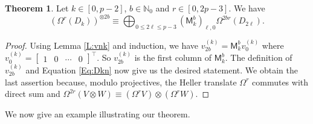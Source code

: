 \documentclass[12pt,reqno]{amsart}
\newcommand{\NN}{\mathbb{N}}
\renewcommand{\leq}{\leqslant}
\newcommand{\M}{\mathsf{M}}
\theoremstyle{definition}
\newtheorem{thm}{Theorem}[section]
\numberwithin{equation}{section}
\begin{document}
\begin{thm}\label{T:PowersofMk}
     Let $k\in [0,p-2]$, $b\in\NN_0$ and $r\in [0,2p-3]$. We have \[(\Omega^r(D_k))^{\otimes 2b} \equiv \bigoplus_{0\leq 2\ell\leq p-3} (\M_k^b)_{\ell,0}\Omega^{2br}(D_{2\ell}).\] 
\end{thm}
\begin{proof}
    Using Lemma \ref{L:vnk} and induction, we have $v_{2b}^{(k)}=\M_k^bv_0^{(k)}$ where $v_0^{(k)}=\begin{bmatrix}
        1&0&\cdots&0
    \end{bmatrix}^\top$. So $v_{2b}^{(k)}$ is the first column of $\M_k^b$. The definition of $v_{2b}^{(k)}$ and Equation \ref{Eq:Dkn} now give us the desired statement. We obtain the last assertion because, modulo projectives, the Heller translate $\Omega^r$ commutes with direct sum and $\Omega^{2r}(V\otimes W)\equiv (\Omega^r V)\otimes (\Omega^r W)$.  
\end{proof}

We now give an example illustrating our theorem.
\end{document}
